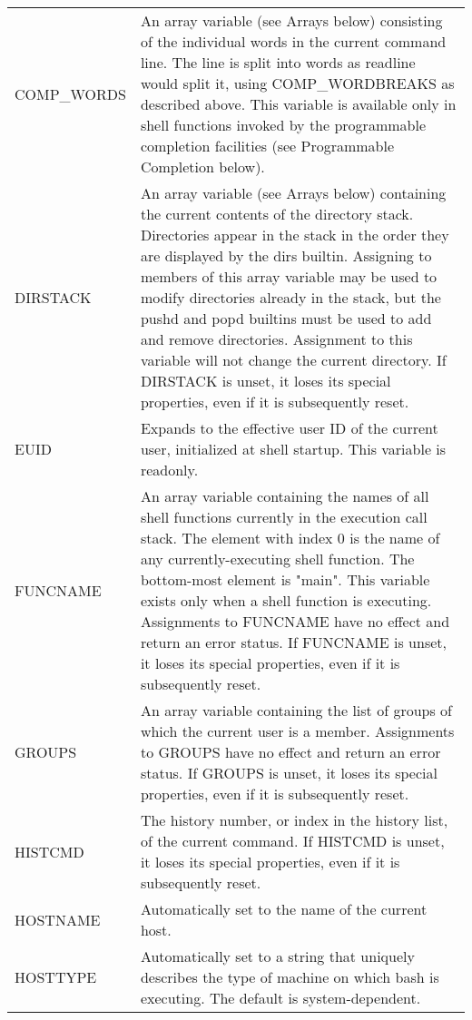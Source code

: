 \documentclass[11pt]{article}
\begin{document}
\begin{longtable}{p{}p{}}
COMP\_WORDS &
An array variable (see Arrays below) consisting of the individual words in the current command line. The line is split into words as readline would split it, using COMP\_WORDBREAKS as described above. This variable is available only in shell functions invoked by the programmable completion facilities (see Programmable Completion below). \\
DIRSTACK &
An array variable (see Arrays below) containing the current contents of the directory stack. Directories appear in the stack in the order they are displayed by the dirs builtin. Assigning to members of this array variable may be used to modify directories already in the stack, but the pushd and popd builtins must be used to add and remove directories. Assignment to this variable will not change the current directory. If DIRSTACK is unset, it loses its special properties, even if it is subsequently reset. \\

EUID &
Expands to the effective user ID of the current user, initialized at shell startup. This variable is readonly. \\

FUNCNAME &
An array variable containing the names of all shell functions currently in the execution call stack. The element with index 0 is the name of any currently-executing shell function. The bottom-most element is "main". This variable exists only when a shell function is executing. Assignments to FUNCNAME have no effect and return an error status. If FUNCNAME is unset, it loses its special properties, even if it is subsequently reset. \\

GROUPS &
An array variable containing the list of groups of which the current user is a member. Assignments to GROUPS have no effect and return an error status. If GROUPS is unset, it loses its special properties, even if it is subsequently reset. \\

HISTCMD &
The history number, or index in the history list, of the current command. If HISTCMD is unset, it loses its special properties, even if it is subsequently reset. \\

HOSTNAME &
Automatically set to the name of the current host. \\

HOSTTYPE &
Automatically set to a string that uniquely describes the type of machine on which bash is executing. The default is system-dependent.\\


\end{longtable}
\end{document}
